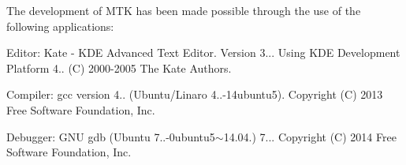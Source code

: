 The development of M\-T\-K has been made possible through the use of the following applications\-:
\begin{DoxyEnumerate}
\item Editor\-: Kate -\/ K\-D\-E Advanced Text Editor. Version 3... Using K\-D\-E Development Platform 4.. (C) 2000-\/2005 The Kate Authors.
\item Compiler\-: gcc version 4.. (Ubuntu/\-Linaro 4..-\/14ubuntu5). Copyright (C) 2013 Free Software Foundation, Inc.
\item Debugger\-: G\-N\-U gdb (Ubuntu 7..-\/0ubuntu5$\sim$14.04.) 7... Copyright (C) 2014 Free Software Foundation, Inc. 
\end{DoxyEnumerate}